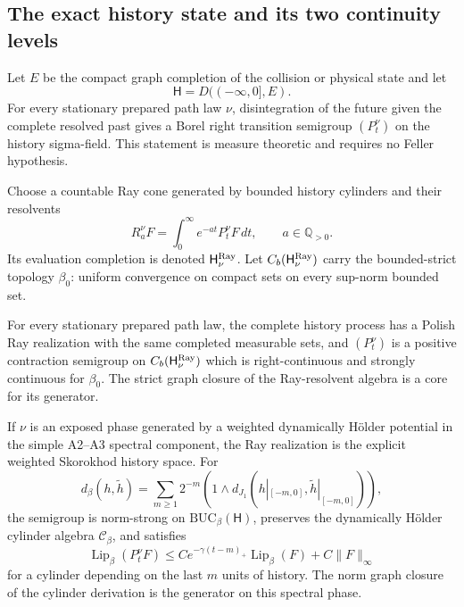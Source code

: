 \subsection{The exact history state and its two continuity levels}

Let \(E\) be the compact graph completion of the collision or physical state
and let
\[
 \mathsf H=D(( -\infty,0],E).
\]
For every stationary prepared path law \(\nu\), disintegration of the future
given the complete resolved past gives a Borel right transition semigroup
\((P_t^\nu)\) on the history sigma-field.  This statement is measure
theoretic and requires no Feller hypothesis.

Choose a countable Ray cone generated by bounded history cylinders and their
resolvents
\[
 R_a^\nu F=\int_0^\infty e^{-at}P_t^\nu F\,dt,
 \qquad a\in\mathbb Q_{>0}.
\]
Its evaluation completion is denoted \(\mathsf H_\nu^{\rm Ray}\).  Let
\(C_b(\mathsf H_\nu^{\rm Ray})\) carry the bounded-strict topology
\(\beta_0\): uniform convergence on compact sets on every sup-norm bounded
set.

\begin{theorem}
\label{thm:r3-a4-feller}
For every stationary prepared path law, the complete history process has a
Polish Ray realization with the same completed measurable sets, and
\((P_t^\nu)\) is a positive contraction semigroup on
\(C_b(\mathsf H_\nu^{\rm Ray})\) which is right-continuous and strongly
continuous for \(\beta_0\).  The strict graph closure of the Ray-resolvent
algebra is a core for its generator.

If \(\nu\) is an exposed phase generated by a weighted dynamically H\"older
potential in the simple A2--A3 spectral component, the Ray realization is the
explicit weighted Skorokhod history space.  For
\[
 d_\beta(h,\widetilde h)=
 \sum_{m\ge1}2^{-m}
 \left(1\wedge d_{J_1}
 (h|_{[-m,0]},\widetilde h|_{[-m,0]})\right),
\]
the semigroup is norm-strong on
\(\mathrm{BUC}_\beta(\mathsf H)\), preserves the dynamically H\"older
cylinder algebra \(\mathscr C_\beta\), and satisfies
\[
 \operatorname{Lip}_\beta(P_t^\nu F)
 \le C e^{-\gamma(t-m)_+}\operatorname{Lip}_\beta(F)
     +C\|F\|_\infty
\]
for a cylinder depending on the last \(m\) units of history.  The norm graph
closure of the cylinder derivation is the generator on this spectral phase.
\end{theorem}

